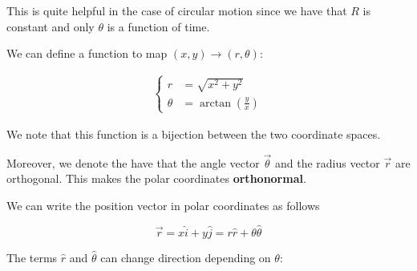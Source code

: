 \documentclass[10pt]{extarticle}
\begin{document}
This is quite helpful in the case of circular motion since we have that $R$ is constant
and only $\theta$ is a function of time.

We can define a function to map $(x, y) \to (r, \theta)$:

\begin{align*}
    \begin{cases}
        r      & = \sqrt{x^2 + y^2}                \\
        \theta & = \arctan\left(\frac{y}{x}\right)
    \end{cases}
\end{align*}

We note that this function is a bijection between the two coordinate spaces.

Moreover, we denote the have that the angle vector $\vec \theta$
and the radius vector $\vec r$ are orthogonal. This makes the polar coordinates \textbf{orthonormal}.

\begin{center}

    \label{fig:polar_frame}
\end{center}

We can write the position vector in polar coordinates as follows

$$
    \vec r = x \hat i + y \hat j = r \hat r + \theta \hat \theta
$$

The terms $\hat r$ and $\hat \theta$ can change direction depending on $\theta$:
\end{document}
